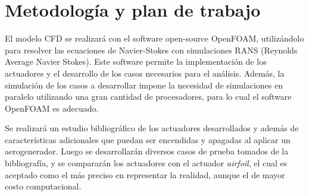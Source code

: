 \documentclass{article}
\numberwithin{equation}{subsection}
\begin{document}
\section{Metodología y plan de trabajo}
El modelo CFD se realizará con el software open-source OpenFOAM, utilizándolo para resolver las ecuaciones de Navier-Stokes con simulaciones RANS (Reynolds Average Navier Stokes). Este software permite la implementación de los actuadores y el desarrollo de los casos necesarios para el análisis. Además, la simulación de los casos a desarrollar impone la necesidad de simulaciones en paralelo utilizando una gran cantidad de procesadores, para lo cual el software OpenFOAM es adecuado.

Se realizará un estudio bibliográfico de los actuadores desarrollados y además de características adicionales que puedan ser encendidas y apagadas al aplicar un aerogenerador. Luego se desarrollarán diversos casos de prueba tomados de la bibliografía, y se compararán los actuadores con el actuador \textit{airfoil}, el cual es aceptado como el más preciso en representar la realidad, aunque el de mayor costo computacional.
\end{document}
